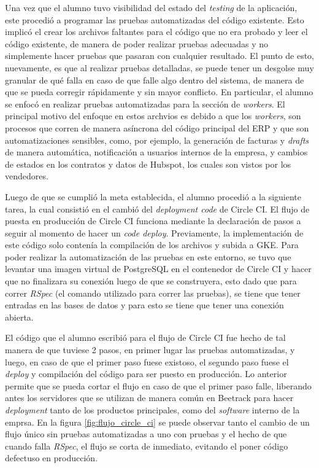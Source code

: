   Una vez que el alumno tuvo visibilidad del estado del \textit{testing} de la aplicación, este procedió a programar las pruebas automatizadas del código existente. Esto implicó el crear los archivos faltantes para el código que no era probado y leer el código existente, de manera de poder realizar pruebas adecuadas y no simplemente hacer pruebas que pasaran con cualquier resultado. El punto de esto, nuevamente, es que al realizar pruebas detalladas, se puede tener un desgolse muy granular de qué falla en caso de que falle algo dentro del sistema, de manera de que se pueda corregir rápidamente y sin mayor conflicto. En particular, el alumno se enfocó en realizar pruebas automatizadas para la sección de \textit{workers}. El principal motivo del enfoque en estos archvios es debido a que los \textit{workers}, son procesos que corren de manera asíncrona del código principal del ERP y que son automatizaciones sensibles, como, por ejemplo, la generación de facturas y \textit{drafts} de manera automática, notificación a usuarios internos de la empresa, y cambios de estados en los contratos y datos de Hubspot, los cuales son vistos por los vendedores.

  Luego de que se cumplió la meta establecida, el alumno procedió a la siguiente tarea, la cual consistió en el cambió del \textit{deployment code} de Circle CI. El flujo de puesta en producción de Circle CI funciona mediante la declaración de pasos a seguir al momento de hacer un \textit{code deploy}. Previamente, la implementación de este código solo contenía la compilación de los archivos y subida a GKE. Para poder realizar la automatización de las pruebas en este entorno, se tuvo que levantar una imagen virtual de PostgreSQL en el contenedor de Circle CI y hacer que no finalizara su conexión luego de que se construyera, esto dado que para correr \textit{RSpec} (el comando utilizado para correr las pruebas), se tiene que tener entradas en las bases de datos y para esto se tiene que tener una conexión abierta.

  El código que el alumno escribió para el flujo de Circle CI fue hecho de tal manera de que tuviese 2 pasos, en primer lugar las pruebas automatizadas, y luego, en caso de que el primer paso fuese existoso, el segundo paso fuese el \textit{deploy} y compilación del código para ser puesto en producción. Lo anterior permite que se pueda cortar el flujo en caso de que el primer paso falle, liberando antes los servidores que se utilizan de manera común en Beetrack para hacer \textit{deployment} tanto de los productos principales, como del \textit{software} interno de la emprsa. En la figura \ref{fig:flujo_circle_ci} se puede observar tanto el cambio de un flujo único sin pruebas automatizadas a uno con pruebas y el hecho de que cuando falla \textit{RSpec}, el flujo se corta de inmediato, evitando el poner código defectuso en producción.

